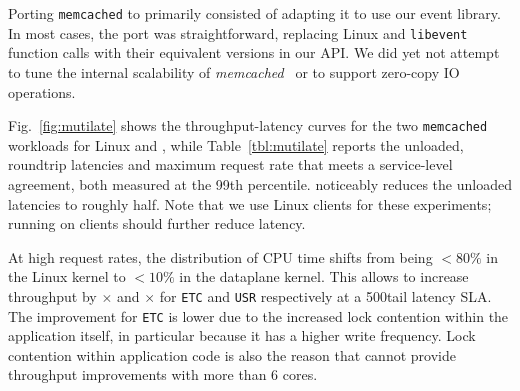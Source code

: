 

Porting \texttt{memcached} to \ix primarily consisted of adapting it
to use our event library. In most cases, the port was straightforward,
replacing Linux and \texttt{libevent} function calls with their
equivalent versions in our API. We did yet not attempt to tune the
internal scalability of {\it memcached}~\cite{DBLP:conf/nsdi/FanAK13}
or to support zero-copy IO operations.


Fig.~\ref{fig:mutilate} shows the throughput-latency curves for the
two \texttt{memcached} workloads for Linux and \ix, while
Table~\ref{tbl:mutilate} reports the unloaded, roundtrip latencies and
maximum request rate that meets a service-level agreement, both
measured at the 99th percentile.  \ix noticeably reduces the unloaded
latencies to roughly half.  Note that we use Linux clients for these
experiments; running \ix on clients should further reduce latency.

At high request rates, the distribution of CPU time shifts from being
$<80\%$ in the Linux kernel to $<10\%$ in the \ix dataplane kernel.
This allows \ix
to increase throughput by $\times$ and $\times$ for
\texttt{ETC} and \texttt{USR} respectively at a 500\microsecond tail
latency SLA.  The improvement for \texttt{ETC} is lower due to the
increased lock contention within the application itself, in particular
because it has a higher write frequency.  Lock contention
within application code is also the reason that \ix cannot provide
throughput improvements with more than 6 cores.


%

